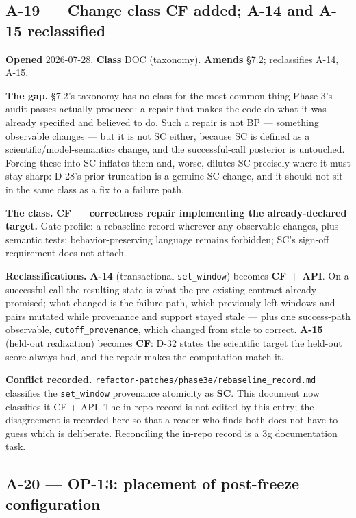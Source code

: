 \documentclass[
  10pt,
]{article}
\begin{document}
\hypertarget{a-19}{%
\subsection{A-19 --- Change class CF added; A-14 and A-15 reclassified}\label{a-19}}

\textbf{Opened} 2026-07-28. \textbf{Class} DOC (taxonomy). \textbf{Amends} §7.2; reclassifies A-14, A-15.

\textbf{The gap.} §7.2's taxonomy has no class for the most common thing Phase 3's audit passes actually produced: a repair that makes the code do what it was already specified and believed to do. Such a repair is not BP --- something observable changes --- but it is not SC either, because SC is defined as a scientific/model-semantics change, and the successful-call posterior is untouched. Forcing these into SC inflates them and, worse, dilutes SC precisely where it must stay sharp: D-28's prior truncation is a genuine SC change, and it should not sit in the same class as a fix to a failure path.

\textbf{The class.} \textbf{CF --- correctness repair implementing the already-declared target.} Gate profile: a rebaseline record wherever any observable changes, plus semantic tests; behavior-preserving language remains forbidden; SC's sign-off requirement does not attach.

\textbf{Reclassifications.} \textbf{A-14} (transactional \texttt{set\_window}) becomes \textbf{CF + API}. On a successful call the resulting state is what the pre-existing contract already promised; what changed is the failure path, which previously left windows and pairs mutated while provenance and support stayed stale --- plus one success-path observable, \texttt{cutoff\_provenance}, which changed from stale to correct. \textbf{A-15} (held-out realization) becomes \textbf{CF}: D-32 states the scientific target the held-out score always had, and the repair makes the computation match it.

\textbf{Conflict recorded.} \texttt{refactor-patches/\allowbreak{}phase3e/\allowbreak{}rebaseline\_record.md} classifies the \texttt{set\_window} provenance atomicity as \textbf{SC}. This document now classifies it CF + API. The in-repo record is not edited by this entry; the disagreement is recorded here so that a reader who finds both does not have to guess which is deliberate. Reconciling the in-repo record is a 3g documentation task.

\hypertarget{a-20}{%
\subsection{A-20 --- OP-13: placement of post-freeze configuration}\label{a-20}}
\end{document}
